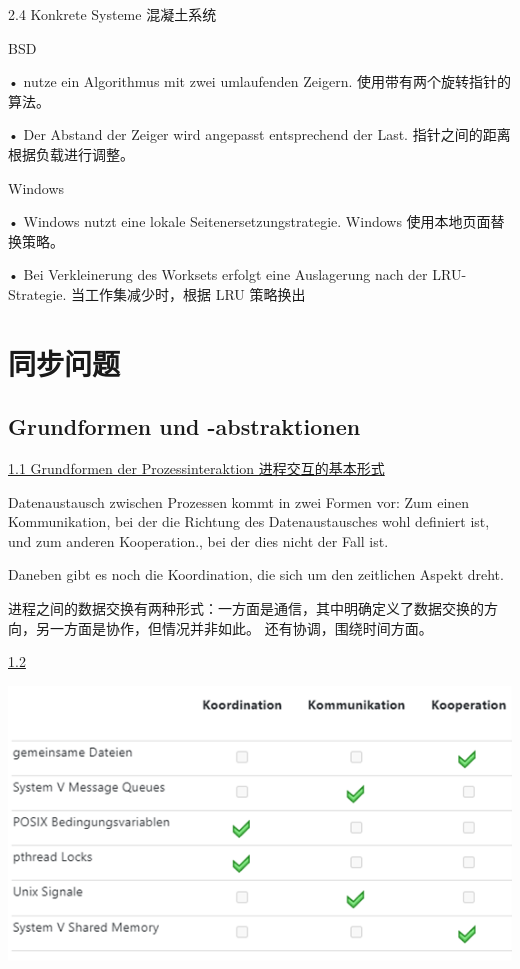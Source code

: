 \documentclass[fleqn]{article}
\begin{document}
2.4 Konkrete Systeme 混凝土系统

\noindent BSD

•	nutze ein Algorithmus mit zwei umlaufenden Zeigern. 
使用带有两个旋转指针的算法。

•	Der Abstand der Zeiger wird angepasst entsprechend der Last. 指针之间的距离根据负载进行调整。

\noindent Windows

•	Windows nutzt eine lokale Seitenersetzungstrategie.
Windows 使用本地页面替换策略。

•	Bei Verkleinerung des Worksets erfolgt eine Auslagerung nach der LRU-Strategie.
当工作集减少时，根据 LRU 策略换出



\section{同步问题}

\subsection{Grundformen und -abstraktionen}

\noindent\uline{1.1	Grundformen der Prozessinteraktion 进程交互的基本形式}

Datenaustausch zwischen Prozessen kommt in zwei Formen vor: Zum einen Kommunikation, bei der die Richtung des Datenaustausches wohl definiert ist, und zum anderen Kooperation., bei der dies nicht der Fall ist.

Daneben gibt es noch die Koordination, die sich um den zeitlichen Aspekt dreht.

进程之间的数据交换有两种形式：一方面是通信，其中明确定义了数据交换的方向，另一方面是协作，但情况并非如此。
还有协调，围绕时间方面。

\noindent\uline{1.2}

\begin{center}
    \includegraphics{26.png}
\end{center}
\end{document}
